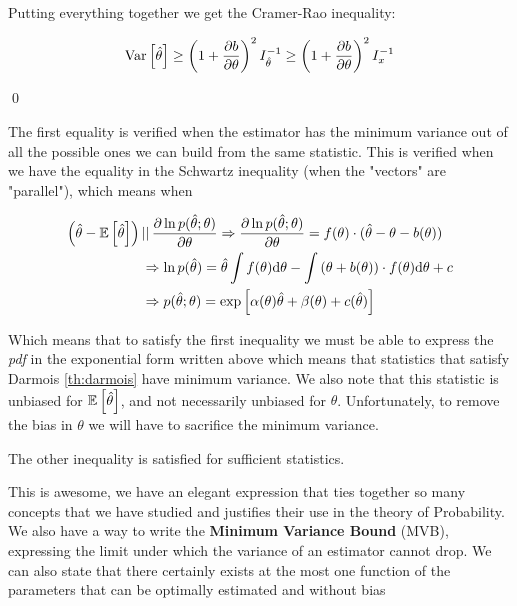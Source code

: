 \begin{example}
	Putting everything together we get the Cramer-Rao inequality:
	
	\[
	\operatorname{Var}\left[\hat\theta\right]\geq \left(1+\frac{\partial b}{\partial\theta}\right)^2 I_{\hat\theta}^{-1} \geq \left(1+\frac{\partial b}{\partial\theta}\right)^2 I_{x}^{-1}
	\]
	
	\qed
	
	The first equality is verified when the estimator has the minimum variance out of all the possible ones we can build from the same statistic. This is verified when we have the equality in the Schwartz inequality (when the "vectors" are "parallel"), which means when
	
	\begin{align*}
	\left(\hat\theta - \mathbb{E}\left[\hat\theta\right]\right)\, &||\, \frac{\partial\ln p (\hat\theta;\theta)}{\partial\theta} \Rightarrow \frac{\partial\ln p(\hat\theta;\theta)}{\partial\theta} = f(\theta) \cdot (\hat\theta-\theta-b(\theta))\\
	&\Rightarrow \ln p(\hat\theta) = \hat\theta\int f(\theta)\mathrm{d} \theta - \int \left(\theta+b(\theta)\right)\cdot f(\theta)\mathrm{d} \theta +c\\
	&\Rightarrow p(\hat\theta;\theta) = \exp\left[\alpha(\theta)\hat\theta+\beta(\theta)+c(\hat\theta)\right]
	\end{align*}
	
	Which means that to satisfy the first inequality we must be able to express the \emph{pdf} in the exponential form written above which means that statistics that satisfy Darmois \ref{th:darmois} have minimum variance. We also note that this statistic is unbiased for $\mathbb{E}\left[\hat\theta\right]$, and not necessarily unbiased for $\theta$. Unfortunately, to remove the bias in $\theta$ we will have to sacrifice the minimum variance. 
	
	The other inequality is satisfied for sufficient statistics. 
\label{def:CR}
\end{example}

This is awesome, we have an elegant expression that ties together so many concepts that we have studied and justifies their use in the theory of Probability. We also have a way to write the \textbf{Minimum Variance Bound} (MVB), expressing the limit under which the variance of an estimator cannot drop. We can also state that there certainly exists at the most one function of the parameters that can be optimally estimated and without bias


